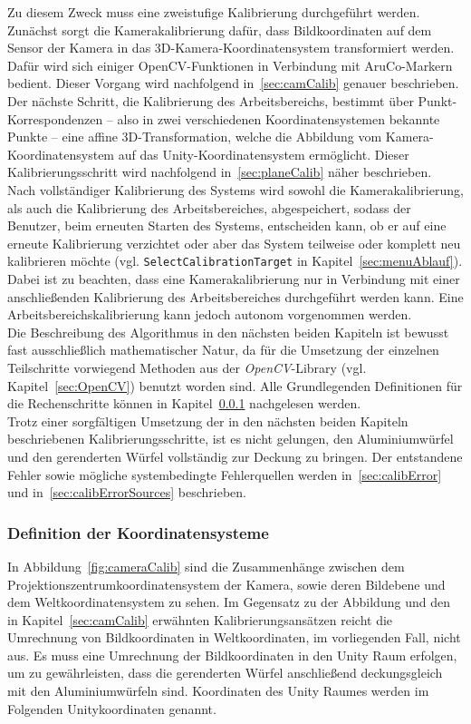 Zu diesem Zweck muss eine zweistufige Kalibrierung durchgeführt werden. Zunächst sorgt die Kamerakalibrierung dafür, dass Bildkoordinaten auf dem Sensor der Kamera in das 3D-Kamera-Koordinatensystem transformiert werden. Dafür wird sich einiger OpenCV-Funktionen in Verbindung mit AruCo-Markern bedient. Dieser Vorgang wird nachfolgend in~\ref{sec:camCalib} genauer beschrieben.\\
Der nächste Schritt, die Kalibrierung des Arbeitsbereichs, bestimmt über Punkt-Korrespondenzen -- also in zwei verschiedenen Koordinatensystemen bekannte Punkte -- eine affine 3D-Transformation, welche die Abbildung vom Kamera-Koordinaten\-system auf das Unity-Koordinatensystem ermöglicht. Dieser Kalibrierungsschritt wird nachfolgend in~\ref{sec:planeCalib} näher beschrieben.\\
Nach vollständiger Kalibrierung des Systems wird sowohl die Kamerakalibrierung, als auch die Kalibrierung des Arbeitsbereiches, abgespeichert, sodass der Benutzer, beim erneuten Starten des Systems, entscheiden kann, ob er auf eine erneute Kalibrierung verzichtet oder aber das System teilweise oder komplett neu kalibrieren möchte (vgl.  \texttt{SelectCalibrationTarget} in Kapitel~\ref{sec:menuAblauf}). Dabei ist zu beachten, dass eine Kamerakalibrierung nur in Verbindung mit einer anschließenden Kalibrierung des Arbeitsbereiches durchgeführt werden kann. Eine Arbeitsbereichskalibrierung kann jedoch autonom vorgenommen werden. \\
Die Beschreibung des Algorithmus in den nächsten beiden Kapiteln ist bewusst fast ausschließlich mathematischer Natur, da für die Umsetzung der einzelnen Teilschritte vorwiegend Methoden aus der \textit{OpenCV}-Library (vgl. Kapitel~\ref{sec:OpenCV}) benutzt worden sind. Alle Grundlegenden Definitionen für die Rechenschritte können in Kapitel~\ref{sec:DefKoords} nachgelesen werden.\\
Trotz einer sorgfältigen Umsetzung der in den nächsten beiden Kapiteln beschriebenen Kalibrierungsschritte, ist es nicht gelungen, den Aluminiumwürfel und den gerenderten Würfel vollständig zur Deckung zu bringen. Der entstandene Fehler sowie mögliche systembedingte Fehlerquellen werden in~\ref{sec:calibError} und in~\ref{sec:calibErrorSources} beschrieben. 

\subsubsection{Definition der Koordinatensysteme} \label{sec:DefKoords} 
In Abbildung~\ref{fig:cameraCalib} sind die Zusammenhänge zwischen dem Projektionszentrumkoordinatensystem der Kamera, sowie deren Bildebene und dem Weltkoordinatensystem zu sehen. Im Gegensatz zu der Abbildung und den in Kapitel~\ref{sec:camCalib} erwähnten Kalibrierungsansätzen reicht die Umrechnung von Bildkoordinaten in Weltkoordinaten, im vorliegenden Fall, nicht aus. Es muss eine Umrechnung der Bildkoordinaten in den Unity Raum erfolgen, um zu gewährleisten, dass die gerenderten Würfel anschließend deckungsgleich mit den Aluminiumwürfeln sind. Koordinaten des Unity Raumes werden im Folgenden Unitykoordinaten genannt.\\

